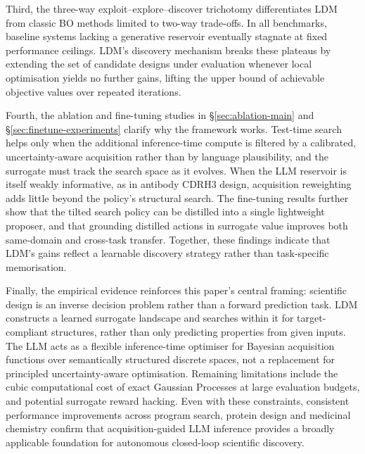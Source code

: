 Third, the three-way exploit–explore–discover trichotomy differentiates LDM from classic BO methods limited to two-way trade-offs. In all benchmarks, baseline systems lacking a generative reservoir eventually stagnate at fixed performance ceilings. LDM’s discovery mechanism breaks these plateaus by extending the set of candidate designs under evaluation whenever local optimisation yields no further gains, lifting the upper bound of achievable objective values over repeated iterations.

Fourth, the ablation and fine-tuning studies in \S\ref{sec:ablation-main} and \S\ref{sec:finetune-experiments} clarify why the framework works. Test-time search helps only when the additional inference-time compute is filtered by a calibrated, uncertainty-aware acquisition rather than by language plausibility, and the surrogate must track the search space as it evolves. When the LLM reservoir is itself weakly informative, as in antibody CDRH3 design, acquisition reweighting adds little beyond the policy's structural search. The fine-tuning results further show that the tilted search policy can be distilled into a single lightweight proposer, and that grounding distilled actions in surrogate value improves both same-domain and cross-task transfer. Together, these findings indicate that LDM's gains reflect a learnable discovery strategy rather than task-specific memorisation.

Finally, the empirical evidence reinforces this paper’s central framing: scientific design is an inverse decision problem rather than a forward prediction task. LDM constructs a learned surrogate landscape and searches within it for target-compliant structures, rather than only predicting properties from given inputs. The LLM acts as a flexible inference-time optimiser for Bayesian acquisition functions over semantically structured discrete spaces, not a replacement for principled uncertainty-aware optimisation. Remaining limitations include the cubic computational cost of exact Gaussian Processes at large evaluation budgets, and potential surrogate reward hacking. Even with these constraints, consistent performance improvements across program search, protein design and medicinal chemistry confirm that acquisition-guided LLM inference provides a broadly applicable foundation for autonomous closed-loop scientific discovery.